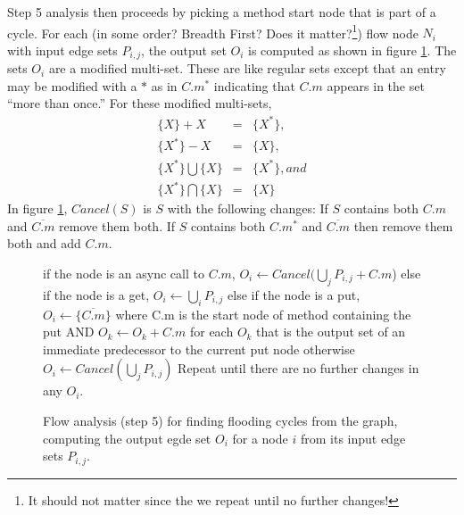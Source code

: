 \documentclass[12pt]{article}%
\begin{document}
Step 5 analysis then proceeds by picking a method start node that is part of a cycle.
For each (in some order? Breadth First? Does it matter?\footnote{It should not matter since the we repeat until no further changes!}) flow node $N_i$ with input edge sets $P_{i,j}$, the output set $O_i$ is
computed as shown in figure \ref{step5}. The sets $O_i$ are a modified multi-set. These are like regular sets except that an entry may be modified with
a $*$ as in $C.m^*$ indicating that $C.m$ appears in the set ``more than once.'' For these modified multi-sets, 
\begin{eqnarray*}
\{X\} + X & = & \{X^*\},\\
\{X^*\} - X & = & \{X\},\\
\{X^*\} \bigcup \{X\} & = & \{X^*\}, and \\
\{X^*\} \bigcap \{X\} & = & \{X\}
\end{eqnarray*} 
In figure \ref{step5},  $Cancel(S)$ is $S$ with the following changes:\newline
If $S$ contains both $C.m$ and $\overline{C.m}$ remove them both.\newline
If $S$ contains both $C.m^*$ and $\overline{C.m}$ then remove them both and add $C.m$.

\begin{figure}
\begin{shaded}
if the node is an async call to $C.m$, $O_i \leftarrow Cancel(\bigcup_j P_{i,j} + C.m$)\newline
else if the node is a get, $O_i \leftarrow \bigcup_i P_{i,j}$\newline
else if the node is a put, \newline
\hspace*{.5cm}  $O_i \leftarrow \{ \overline{C.m} \}$ where C.m is the start node of method containing the put\newline
AND $O_k \leftarrow O_k + C.m$ for each $O_k$ that is the output set of an immediate predecessor to the current put node\newline
otherwise $O_i \leftarrow Cancel(\bigcup_j P_{i,j})$\newline
Repeat until there are no further changes in any $O_i$.%
\end{shaded}%
\caption{\label{step5}%
Flow analysis (step 5) for finding flooding cycles from the graph,
computing the output egde set $O_i$ for a node $i$ from its input edge sets 
$P_{i,j}$.
}
\end{figure}
\end{document}
